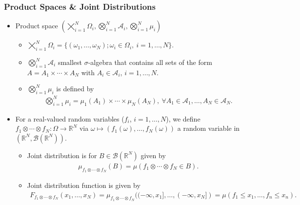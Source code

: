 \documentclass[oneside]{article}
\numberwithin{equation}{section}
\begin{document}
\subsubsection{Product Spaces \& Joint Distributions}
\begin{itemize}
    \item Product space $(\bigtimes_{i=1}^N \Omega_i,\bigotimes_{i=1}^N \mathcal{A}_i,\bigotimes_{i=1}^N \mu_i)$
    \begin{itemize}
        \item $\bigtimes_{i=1}^N \Omega_i = \{(\omega_1,\ldots,\omega_N);\omega_i\in\Omega_i,\ i = 1,\ldots,N\}$.
        \item $\bigotimes_{i=1}^N \mathcal{A}_i$ smallest $\sigma$-algebra that contains all sets of the form $A = A_1\times\cdots\times A_N$ with $A_i\in\mathcal{A}_i$, $i = 1,\ldots,N$.
        \item $\bigotimes_{i=1}^N \mu_i$ is defined by
        \begin{align*}
            \bigotimes_{i=1}^N \mu_i = \mu_1(A_1)\times\cdots\times\mu_N(A_N),\ \forall A_1\in\mathcal{A}_1,\ldots,A_N\in\mathcal{A}_N.
        \end{align*}
    \end{itemize}
    \item For a real-valued random variables ($f_i$, $i = 1,\ldots,N$), we define $f_1\otimes\cdots\otimes f_N:\Omega\to\mathbb{R}^N$ via $\omega\mapsto(f_1(\omega),\ldots,f_N(\omega))$ a random variable in $(\mathbb{R}^N,\mathcal{B}(\mathbb{R}^N))$.
    \begin{itemize}
        \item Joint distribution is for $B\in\mathcal{B}(\mathbb{R}^N)$ given by
        \begin{align*}
            \mu_{f_1\otimes\cdots\otimes f_N}(B) = \mu(f_1\otimes\cdots\otimes f_N\in B).
        \end{align*}
        \item Joint distribution function is given by
        \begin{align*}
            F_{f_1\otimes\cdots\otimes f_N}(x_1,\ldots,x_N) = \mu_{f_1\otimes\cdots\otimes f_N} ((-\infty,x_1],\ldots,(-\infty,x_N]) = \mu(f_1\le x_1,\ldots,f_n\le x_n).
        \end{align*}
    \end{itemize}
\end{itemize}
\end{document}
